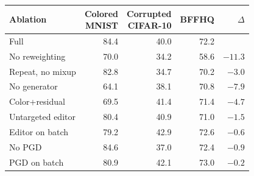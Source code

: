 \begin{tabular}[t]{@{}lrrrr@{}}
\toprule
Ablation&\shortstack{Colored\\MNIST}&\shortstack{Corrupted\\CIFAR-10}&BFFHQ&$\Delta$\\
\midrule
Full&84.4&40.0&72.2&\\
No reweighting&70.0&34.2&58.6&$-11.3$\\
Repeat, no mixup&82.8&34.7&70.2&$-3.0$\\
No generator&64.1&38.1&70.8&$-7.9$\\
Color+residual&69.5&41.4&71.4&$-4.7$\\
Untargeted editor&80.4&40.9&71.0&$-1.5$\\
Editor on batch&79.2&42.9&72.6&$-0.6$\\
No PGD&84.6&37.0&72.4&$-0.9$\\
PGD on batch&80.9&42.1&73.0&$-0.2$\\
\bottomrule
\end{tabular}
